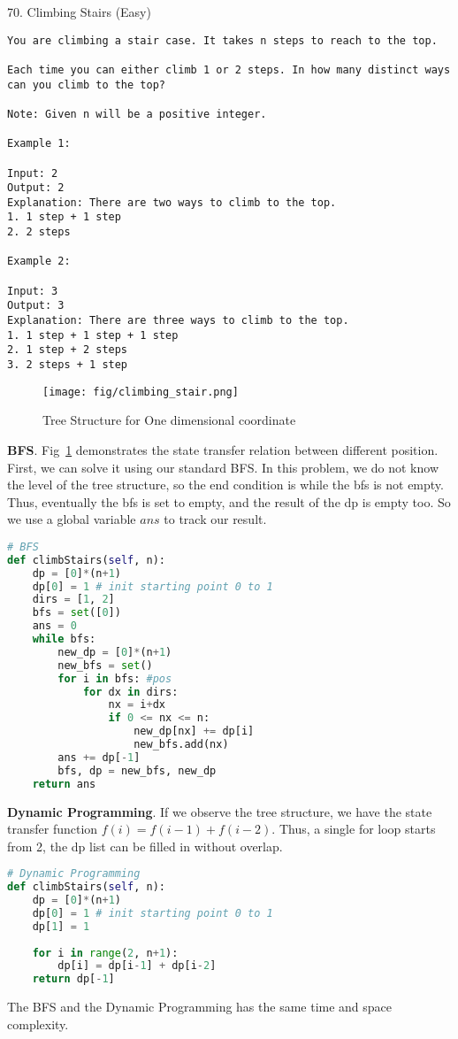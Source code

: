 \documentclass[../main.tex]{subfiles}
\begin{document}
70. Climbing Stairs (Easy)
\begin{lstlisting}
You are climbing a stair case. It takes n steps to reach to the top.

Each time you can either climb 1 or 2 steps. In how many distinct ways can you climb to the top?

Note: Given n will be a positive integer.

Example 1:

Input: 2
Output: 2
Explanation: There are two ways to climb to the top.
1. 1 step + 1 step
2. 2 steps

Example 2:

Input: 3
Output: 3
Explanation: There are three ways to climb to the top.
1. 1 step + 1 step + 1 step
2. 1 step + 2 steps
3. 2 steps + 1 step
\end{lstlisting}
\begin{figure}[h]
    \centering
    \texttt{[image: fig/climbing\_stair.png]}
    \caption{Tree Structure for One dimensional coordinate}
    \label{fig:tree_climbing_stair}
\end{figure}
\textbf{BFS}. Fig~\ref{fig:tree_climbing_stair} demonstrates the state transfer relation between different position. First, we can solve it using our standard BFS. In this problem, we do not know the level of the tree structure, so the end condition is while the bfs is not empty. Thus, eventually the bfs is set to empty, and the result of the dp is empty too. So we use a global variable $ans$ to track our result.
\begin{lstlisting}[language=Python]
# BFS
def climbStairs(self, n):
    dp = [0]*(n+1)
    dp[0] = 1 # init starting point 0 to 1
    dirs = [1, 2]
    bfs = set([0])
    ans = 0
    while bfs:
        new_dp = [0]*(n+1)
        new_bfs = set()
        for i in bfs: #pos 
            for dx in dirs:
                nx = i+dx
                if 0 <= nx <= n:
                    new_dp[nx] += dp[i]
                    new_bfs.add(nx)
        ans += dp[-1]
        bfs, dp = new_bfs, new_dp
    return ans
\end{lstlisting}
\textbf{Dynamic Programming}. If we observe the tree structure, we have the state transfer function $f(i) = f(i-1) + f(i-2)$. Thus, a single for loop starts from 2, the dp list can be filled in without overlap. 
\begin{lstlisting}[language=Python]
# Dynamic Programming
def climbStairs(self, n):
    dp = [0]*(n+1)
    dp[0] = 1 # init starting point 0 to 1
    dp[1] = 1
    
    for i in range(2, n+1):
        dp[i] = dp[i-1] + dp[i-2]
    return dp[-1]
\end{lstlisting}
The BFS and the Dynamic Programming has the same time and space complexity.
\end{document}
